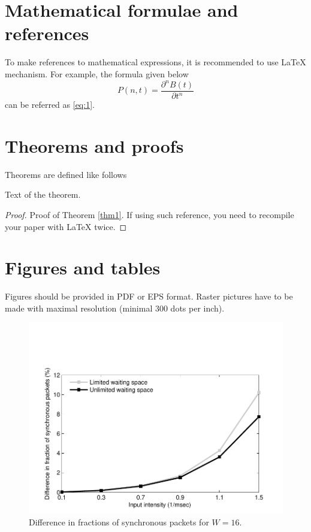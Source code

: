 \documentclass[10pt]{article}
\begin{document}
\section{Mathematical formulae and references}

To make references to mathematical expressions, it is
recommended to use \LaTeX{} mechanism. For example, the formula
given below
\begin{equation}
\label{eq:1}
P(n,t)=\frac{\partial^n B(t)}{\partial t^n}
\end{equation}
can be referred as \eqref{eq:1}.

\section{Theorems and proofs}

Theorems are defined like follows
\begin{thm}\label{thm1}
Text of the theorem.
\end{thm}

\begin{proof}
Proof of Theorem \ref{thm1}. If using such reference, you need
to recompile your paper with \LaTeX{} twice.
\end{proof}


\section{Figures and tables}

Figures should be provided in PDF or EPS format. Raster pictures have
to be made with maximal resolution (minimal 300 dots per inch).

\begin{figure}[h!]
   \centering
    \includegraphics[width=\textwidth]{1.pdf} %
    \caption {Difference in fractions of synchronous packets for $W=16$.}
    \label{pic1}
\end{figure}
\end{document}
